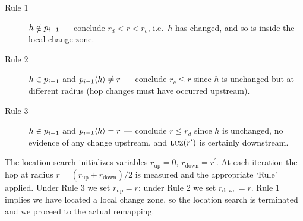 
\begin{description}
%
	\item[Rule 1] $h \notin p_{i-1}$ --- conclude $r_d < r <
	r_c$, i.e.~$h$ has changed, and so is inside the local change
	zone.
%
	\item[Rule 2] $h \in p_{i-1}$ and $p_{i-1}\langle h\rangle
	\ne r$ --- conclude $r_c \le r$ since $h$ is unchanged but at
	different radius (hop changes must have occurred upstream).
%
	\item[Rule 3] $h\in p_{i-1}$ and $p_{i-1}\langle h\rangle =
	r$ --- conclude $r \le r_d$ since $h$ is unchanged, no evidence
	of any change upstream, and $\mathrm{\textsc{lcz}}(r')$ is certainly downstream.
%
\end{description}

The location search initializes variables $r_\mathrm{up} = 0$,
$r_\mathrm{down} = r^\prime$.  At each iteration the hop at radius $r =
(r_\mathrm{up} + r_\mathrm{down})/2$ is measured and the appropriate
`Rule' applied.  Under Rule 3 we set $r_\mathrm{up} = r$; under Rule 2
we set $r_\mathrm{down} = r$.  Rule 1 implies we have located a local
change zone, so the location search is terminated and we proceed to the
actual remapping.








